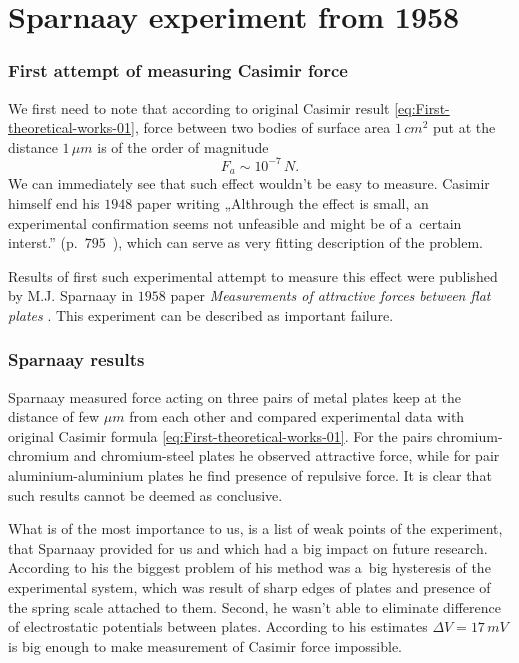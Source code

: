 \documentclass[10pt,t]{beamer}
\begin{document}
\section{Sparnaay experiment from 1958}


\begin{frame}
  \frametitle{First attempt of measuring Casimir force}


  We first need to note that according to original Casimir result
  \eqref{eq:First-theoretical-works-01},
  force between two bodies of surface area $1 \, \si{cm}^{ 2 }$
  put at the distance $1 \, \mu\si{m}$ is of the order of magnitude
  \begin{equation}
    \label{eq:Sparnaay-experiment-from-ETC-01}
    F_{ a } \sim 10^{ -7 } \, \si{N}.
  \end{equation}
  We can immediately see that such effect wouldn't be easy to measure.
  Casimir himself end his $1948$ paper writing „Althrough the effect is
  small, an experimental confirmation seems not unfeasible and might be of
  a~certain interst.”
  (p.~$795$~\parencite{Casimir-On-the-Attraction-Between-ETC-Pub-1948}),
  which can serve as very fitting description of the problem.

  Results of first such experimental attempt to measure this effect were
  published by M.J. Sparnaay in $1958$ paper \textit{Measurements of
    attractive forces between flat plates}
  \parencite{Sparnaay-Measurments-of-attractive-forces-ETC-Pub-1958}.
  This experiment can be described as important failure.

\end{frame}





\begin{frame}
  \frametitle{Sparnaay results}


  Sparnaay measured force acting on three pairs of metal plates keep at the
  distance of few $\mu\si{m}$ from each other and compared experimental data
  with original Casimir formula \eqref{eq:First-theoretical-works-01}. For
  the pairs chromium-chromium and chromium-steel plates he observed
  attractive force,
  while for pair aluminium-aluminium plates he find presence of repulsive
  force. It is clear that such results cannot be deemed as conclusive.

  What is of the most importance to us, is a list of weak points of the
  experiment, that Sparnaay provided for us and which had a big impact on
  future research. According to his the biggest problem of his method was
  a~big hysteresis of the experimental system, which was result of sharp
  edges of plates and presence of the spring scale attached to them.
  Second, he
  wasn't able to eliminate difference of electrostatic potentials between
  plates. According to his estimates $\Delta V = 17 \, \si{mV}$ is big enough to
  make measurement of Casimir force impossible.

\end{frame}
\end{document}
